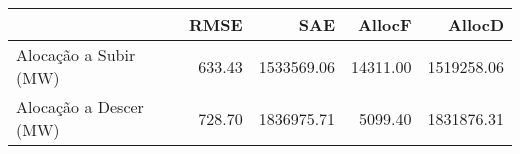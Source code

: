 \begin{tabular}{lrrrr}
\toprule
 & RMSE & SAE & AllocF & AllocD \\
\midrule
Alocação a Subir (MW) & 633.43 & 1533569.06 & 14311.00 & 1519258.06 \\
Alocação a Descer (MW) & 728.70 & 1836975.71 & 5099.40 & 1831876.31 \\
\bottomrule
\end{tabular}
